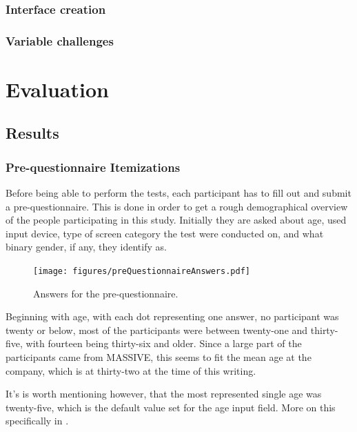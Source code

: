 \documentclass[nofilelist,dvipsnames]{cslthse-msc}
\begin{document}
			\subsection{Interface creation}

			\subsection{Variable challenges}

	\chapter{Evaluation}

		\section{Results}

			\subsection{Pre-questionnaire Itemizations}

        Before being able to perform the tests, each participant has to fill
        out and submit a pre-questionnaire. This is done in order to get
        a rough demographical overview of the people participating in this
        study. Initially they are asked about age, used input device, type of
        screen category the test were conducted on, and what binary gender, if
        any, they identify as.

				\begin{figure}[h!]
					\centering
					\texttt{[image: figures/preQuestionnaireAnswers.pdf]}
					\caption{Answers for the pre-questionnaire.}
				\end{figure}

        Beginning with age, with each dot representing one answer, no
        participant was twenty or below, most of the  participants were between
        twenty-one and thirty-five, with fourteen being thirty-six and older.
        Since a large part of the participants came from MASSIVE, this seems to
        fit the mean age at the company, which is at thirty-two{\findref} at
        the time of this writing.

        It's is worth mentioning however, that the most represented single age
        was twenty-five, which is the default value set for the age input
        field. More on this specifically in .
\end{document}
